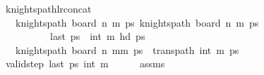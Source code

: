 \begin{isabellebody}
\begin{isamarkuptext}
\end{isamarkuptext}\isamarkuptrue%
\isamarkupfalse%
\ knights{\isacharunderscore}{\kern0pt}path{\isacharunderscore}{\kern0pt}lr{\isacharunderscore}{\kern0pt}concat{\isacharcolon}{\kern0pt}\isanewline
\ \ \ {\isachardoublequoteopen}knights{\isacharunderscore}{\kern0pt}path\ {\isacharparenleft}{\kern0pt}board\ n\ m\ ps\ {\isachardoublequoteopen}knights{\isacharunderscore}{\kern0pt}path\ {\isacharparenleft}{\kern0pt}board\ n\ m\ ps\ \isanewline
\ \ \ \ \ \ \ \ \ \ {\isachardoublequoteopen}last\ ps\ {\isacharequal}{\kern0pt}\ {\isacharparenleft}{\kern0pt}{}{\isacharcomma}{\kern0pt}int\ m\ {\isachardoublequoteopen}hd\ ps\ {\isacharequal}{\kern0pt}\ {\isacharparenleft}{\kern0pt}{}{\isacharcomma}{\kern0pt}{}{\isacharparenright}{\kern0pt}{\isachardoublequoteclose}\isanewline
\ \ \ {\isachardoublequoteopen}knights{\isacharunderscore}{\kern0pt}path\ {\isacharparenleft}{\kern0pt}board\ n\ {\isacharparenleft}{\kern0pt}mm\ {\isacharparenleft}{\kern0pt}ps\ {\isacharat}{\kern0pt}\ {\isacharparenleft}{\kern0pt}trans{\isacharunderscore}{\kern0pt}path\ {\isacharparenleft}{\kern0pt}{}{\isacharcomma}{\kern0pt}int\ m\ ps\isanewline
%
\isadelimproof
%
\endisadelimproof
%
\isatagproof
{}\isamarkupfalse%
\ {\isacharminus}{\kern0pt}\isanewline
\ \ \isamarkupfalse%
\ {\isachardoublequoteopen}valid{\isacharunderscore}{\kern0pt}step\ {\isacharparenleft}{\kern0pt}last\ ps\ {\isacharparenleft}{\kern0pt}{}{\isacharcomma}{\kern0pt}int\ m\isanewline
\ \ \ \ \isamarkupfalse%
\ assms\ \isamarkupfalse%

\end{isabellebody}
